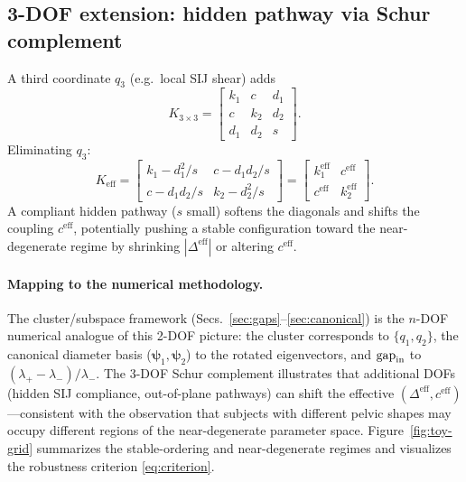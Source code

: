 \documentclass[11pt]{article}
\begin{document}
\subsection{3-DOF extension: hidden pathway via Schur complement}
\label{sec:3dof}
A third coordinate $q_3$ (e.g.\ local SIJ shear) adds
\begin{equation}
K_{3\times3}=
\begin{bmatrix}
k_1 & c & d_1\\
c & k_2 & d_2\\
d_1 & d_2 & s
\end{bmatrix}.
\end{equation}
Eliminating $q_3$:
\begin{equation}
K_{\mathrm{eff}}=
\begin{bmatrix}
k_1 - d_1^2/s & c - d_1 d_2/s\\
c - d_1 d_2/s & k_2 - d_2^2/s
\end{bmatrix}
=
\begin{bmatrix}
k_1^{\mathrm{eff}} & c^{\mathrm{eff}}\\
c^{\mathrm{eff}} & k_2^{\mathrm{eff}}
\end{bmatrix}.
\end{equation}
A compliant hidden pathway ($s$ small) softens the diagonals and shifts the coupling $c^{\mathrm{eff}}$, potentially pushing a stable configuration toward the near-degenerate regime by shrinking $|\Delta^{\mathrm{eff}}|$ or altering $c^{\mathrm{eff}}$.

\paragraph{Mapping to the numerical methodology.}
The cluster/subspace framework (Secs.~\ref{sec:gaps}--\ref{sec:canonical}) is the $n$-DOF numerical analogue of this 2-DOF picture: the cluster corresponds to $\{q_1,q_2\}$, the canonical diameter basis ($\boldsymbol\psi_1, \boldsymbol\psi_2$) to the rotated eigenvectors, and $\mathrm{gap}_{\rm in}$ to $(\lambda_+ - \lambda_-)/\lambda_-$.
The 3-DOF Schur complement illustrates that additional DOFs (hidden SIJ compliance, out-of-plane pathways) can shift the effective $(\Delta^{\mathrm{eff}}, c^{\mathrm{eff}})$---consistent with the observation that subjects with different pelvic shapes may occupy different regions of the near-degenerate parameter space.
Figure~\ref{fig:toy-grid} summarizes the stable-ordering and near-degenerate regimes and visualizes the robustness criterion \eqref{eq:criterion}.
\end{document}
